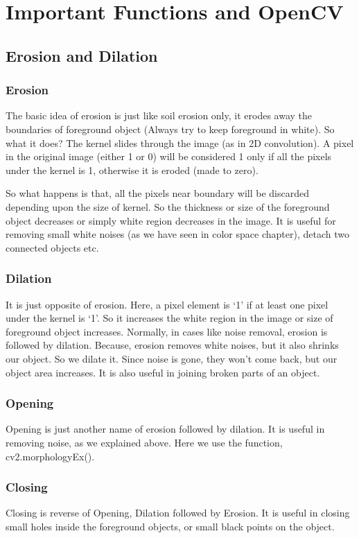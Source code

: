 \documentclass{report}
\begin{document}
\chapter{Important Functions and OpenCV}
\section{Erosion and Dilation}
\subsection{Erosion} \label{ssec:erosion}
The basic idea of erosion is just like soil erosion only, it erodes away the boundaries of foreground object (Always try to keep foreground in white). So what it does? The kernel slides through the image (as in 2D convolution). A pixel in the original image (either 1 or 0) will be considered 1 only if all the pixels under the kernel is 1, otherwise it is eroded (made to zero).

So what happens is that, all the pixels near boundary will be discarded depending upon the size of kernel. So the thickness or size of the foreground object decreases or simply white region decreases in the image. It is useful for removing small white noises (as we have seen in color space chapter), detach two connected objects etc.
\subsection{Dilation} \label{ssec:dilation}
It is just opposite of erosion. Here, a pixel element is ‘1’ if at least one pixel under the kernel is ‘1’. So it increases the white region in the image or size of foreground object increases. Normally, in cases like noise removal, erosion is followed by dilation. Because, erosion removes white noises, but it also shrinks our object. So we dilate it. Since noise is gone, they won’t come back, but our object area increases. It is also useful in joining broken parts of an object.
\subsection{Opening}
Opening is just another name of erosion followed by dilation. It is useful in removing noise, as we explained above. Here we use the function, cv2.morphologyEx().
\subsection{Closing}
Closing is reverse of Opening, Dilation followed by Erosion. It is useful in closing small holes inside the foreground objects, or small black points on the object.
\end{document}
